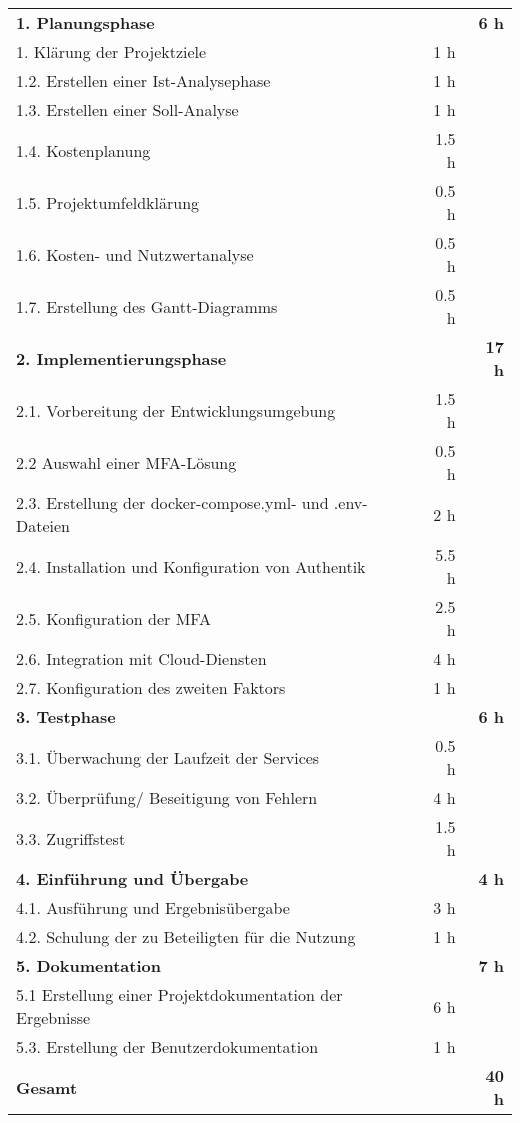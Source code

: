 \begin{tabularx}{\textwidth}{Xrrr}
\rowcolor{heading}\textbf{1. Planungsphase} & \textbf{} & \textbf{} & \textbf{6 h} \\
1. Klärung der Projektziele &       &   1 h   &  \\
\rowcolor{odd}1.2. Erstellen einer Ist-Analysephase &       &    1 h   &  \\
1.3. Erstellen einer Soll-Analyse &       &    1 h    &  \\
\rowcolor{odd}1.4. Kostenplanung &       &   1.5 h   &  \\
1.5. Projektumfeldklärung &       &    0.5 h   &  \\
\rowcolor{odd}1.6. Kosten- und Nutzwertanalyse &       &    0.5 h   &  \\
1.7. Erstellung des Gantt-Diagramms &        &    0.5 h     &   \\
\rowcolor{heading}\textbf{2. Implementierungsphase} & \textbf{} & \textbf{} & \textbf{17 h} \\
2.1. Vorbereitung der Entwicklungsumgebung &       &    1.5 h   &  \\
\rowcolor{odd}2.2 Auswahl einer MFA-Lösung  &       &    0.5 h   &  \\
2.3. Erstellung der docker-compose.yml- und .env-Dateien &       &   2 h    &  \\
\rowcolor{odd}2.4. Installation und Konfiguration von Authentik &      &   5.5 h    &  \\
2.5. Konfiguration der MFA &       &   2.5 h   &  \\
\rowcolor{odd}2.6. Integration mit Cloud-Diensten &     &   4 h    &  \\
2.7. Konfiguration des zweiten Faktors &       &    1 h    &   \\
\rowcolor{heading}\textbf{3. Testphase} & \textbf{} & \textbf{} & \textbf{6 h} \\
3.1. Überwachung der Laufzeit der Services &       &    0.5 h    &  \\
\rowcolor{odd}3.2. Überprüfung/ Beseitigung von Fehlern &       &    4 h   &  \\
3.3. Zugriffstest &        &    1.5 h   &    \\
\rowcolor{heading}\textbf{4. Einführung und Übergabe} & \textbf{} & \textbf{} & \textbf{4 h} \\
4.1. Ausführung und Ergebnisübergabe &       &    3 h   &  \\
\rowcolor{odd}4.2. Schulung der zu Beteiligten für die Nutzung &      &   1 h   &    \\
\rowcolor{heading}\textbf{5. Dokumentation} & \textbf{} & \textbf{} & \textbf{7 h} \\
5.1 Erstellung einer Projektdokumentation der Ergebnisse &       &   6 h   &  \\
\rowcolor{odd}5.3. Erstellung der Benutzerdokumentation &       &    1 h   &    \\
\hline
\hline
\rowcolor{heading}\textbf{Gesamt} & \textbf{} & \textbf{} & \textbf{40 h} \\
\end{tabularx}
